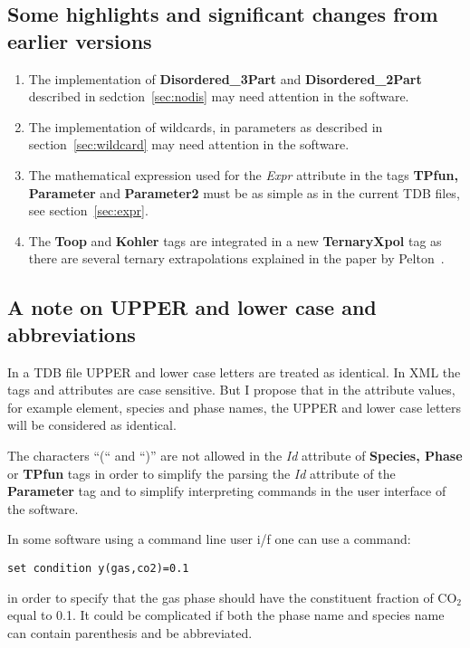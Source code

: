 \documentclass{article}
\begin{document}
\subsection{Some highlights and significant changes from earlier versions}\label{sec:changes}

\begin{enumerate}
\item The implementation of {\bf Disordered\_3Part} and {\bf
  Disordered\_2Part} described in sedction~\ref{sec:nodis} may need
attention in the software.

\item The implementation of wildcards, in parameters as described in
section~\ref{sec:wildcard} may need attention in the software.

\item The mathematical expression used for the {\em Expr} attribute in the
tags {\bf TPfun, Parameter} and {\bf Parameter2} must be as simple
as in the current TDB files, see section~\ref{sec:expr}.

\item The {\bf Toop} and {\bf Kohler} tags are integrated in a new
  {\bf TernaryXpol} tag as there are several ternary extrapolations
  explained in the paper by Pelton~\cite{01Pel}.
\end{enumerate}

\subsection{A note on UPPER and lower case and abbreviations}

In a TDB file UPPER and lower case letters are treated as identical.
In XML the tags and attributes are case sensitive.  But I propose that
in the attribute values, for example element, species and phase names,
the UPPER and lower case letters will be considered as identical.

The characters ``(`` and ``)'' are not allowed in the {\em Id}
attribute of {\bf Species, Phase} or {\bf TPfun} tags in order to
simplify the parsing the {\em Id} attribute of the {\bf Parameter} tag
and to simplify interpreting commands in the user interface of the
software.

In some software using a command line user i/f one can use a command:

\vspace{-3mm}
\begin{verbatim}
set condition y(gas,co2)=0.1
\end{verbatim}
\noindent
in order to specify that the gas phase should have the constituent
fraction of CO$_2$ equal to 0.1.  It could be complicated if both the
phase name and species name can contain parenthesis and be
abbreviated.
\end{document}
